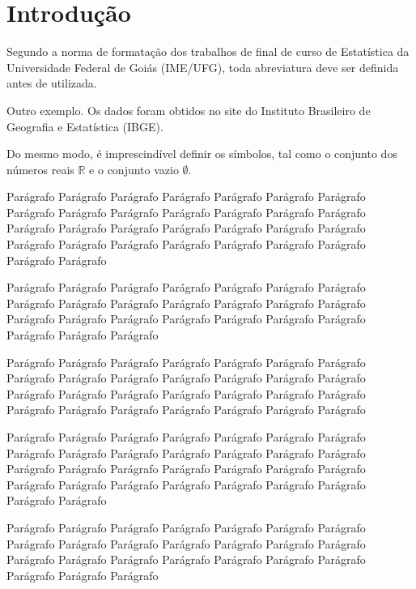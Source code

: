 
\chapter*[Introdução]{Introdução}\label{cap_introducao}


Segundo a norma de formatação dos trabalhos de final de curso de Estatística da Universidade Federal de Goiás (IME/UFG), toda abreviatura deve ser definida antes de utilizada.

Outro exemplo. Os dados foram obtidos no site do Instituto Brasileiro de Geografia e Estatística (IBGE). 

Do mesmo modo, é imprescindível definir os símbolos, tal como o conjunto dos números reais $\mathbb{R}$ e o conjunto vazio $\emptyset$.
 

Parágrafo Parágrafo Parágrafo Parágrafo Parágrafo Parágrafo Parágrafo Parágrafo Parágrafo Parágrafo Parágrafo Parágrafo Parágrafo Parágrafo Parágrafo Parágrafo Parágrafo Parágrafo Parágrafo Parágrafo Parágrafo Parágrafo Parágrafo Parágrafo Parágrafo Parágrafo Parágrafo Parágrafo Parágrafo Parágrafo 

Parágrafo Parágrafo Parágrafo Parágrafo Parágrafo Parágrafo Parágrafo Parágrafo Parágrafo Parágrafo Parágrafo Parágrafo Parágrafo Parágrafo Parágrafo Parágrafo Parágrafo Parágrafo Parágrafo Parágrafo Parágrafo Parágrafo Parágrafo Parágrafo 

Parágrafo Parágrafo Parágrafo Parágrafo Parágrafo Parágrafo Parágrafo Parágrafo Parágrafo Parágrafo Parágrafo Parágrafo Parágrafo Parágrafo Parágrafo Parágrafo Parágrafo Parágrafo Parágrafo Parágrafo Parágrafo Parágrafo Parágrafo Parágrafo Parágrafo Parágrafo Parágrafo Parágrafo 

Parágrafo Parágrafo Parágrafo Parágrafo Parágrafo Parágrafo Parágrafo Parágrafo Parágrafo Parágrafo Parágrafo Parágrafo Parágrafo Parágrafo Parágrafo Parágrafo Parágrafo Parágrafo Parágrafo Parágrafo Parágrafo Parágrafo Parágrafo Parágrafo Parágrafo Parágrafo Parágrafo Parágrafo Parágrafo Parágrafo 

Parágrafo Parágrafo Parágrafo Parágrafo Parágrafo Parágrafo Parágrafo Parágrafo Parágrafo Parágrafo Parágrafo Parágrafo Parágrafo Parágrafo Parágrafo Parágrafo Parágrafo Parágrafo Parágrafo Parágrafo Parágrafo Parágrafo Parágrafo Parágrafo 

